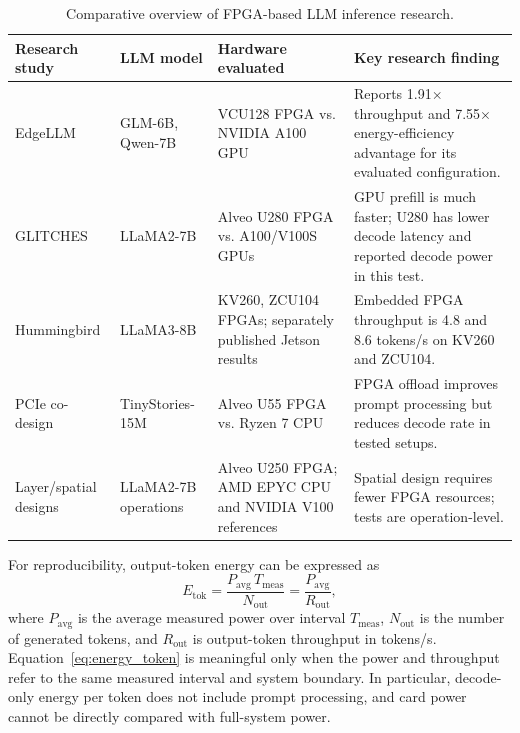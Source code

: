 \begin{table}[t]
\caption{Comparative overview of FPGA-based LLM inference research.}
\label{tab:study_scope}
\centering\scriptsize
\begin{tabular}{p{}p{}p{}p{}}
\hline
Research study & LLM model & Hardware evaluated & Key research finding\\ \hline
EdgeLLM \cite{huang2025edgellm} & GLM-6B, Qwen-7B & VCU128 FPGA vs. NVIDIA A100 GPU & Reports 1.91$\times$ throughput and 7.55$\times$ energy-efficiency advantage for its evaluated configuration.\\
GLITCHES \cite{yang2024glitches} & LLaMA2-7B & Alveo U280 FPGA vs. A100/V100S GPUs & GPU prefill is much faster; U280 has lower decode latency and reported decode power in this test.\\
Hummingbird \cite{li2025hummingbird} & LLaMA3-8B & KV260, ZCU104 FPGAs; separately published Jetson results & Embedded FPGA throughput is 4.8 and 8.6 tokens/s on KV260 and ZCU104.\\
PCIe co-design \cite{chang2025codesign} & TinyStories-15M & Alveo U55 FPGA vs. Ryzen 7 CPU & FPGA offload improves prompt processing but reduces decode rate in tested setups.\\
Layer/spatial designs \cite{prieto2024comparative} & LLaMA2-7B operations & Alveo U250 FPGA; AMD EPYC CPU and NVIDIA V100 references & Spatial design requires fewer FPGA resources; tests are operation-level.\\ \hline
\end{tabular}
\end{table}

For reproducibility, output-token energy can be expressed as
\begin{equation}\label{eq:energy_token}
E_{\mathrm{tok}}=\frac{P_{\mathrm{avg}}\,T_{\mathrm{meas}}}{N_{\mathrm{out}}}=\frac{P_{\mathrm{avg}}}{R_{\mathrm{out}}},
\end{equation}
where $P_{\mathrm{avg}}$ is the average measured power over interval $T_{\mathrm{meas}}$, $N_{\mathrm{out}}$ is the number of generated tokens, and $R_{\mathrm{out}}$ is output-token throughput in tokens/s. Equation~\eqref{eq:energy_token} is meaningful only when the power and throughput refer to the same measured interval and system boundary. In particular, decode-only energy per token does not include prompt processing, and card power cannot be directly compared with full-system power.

